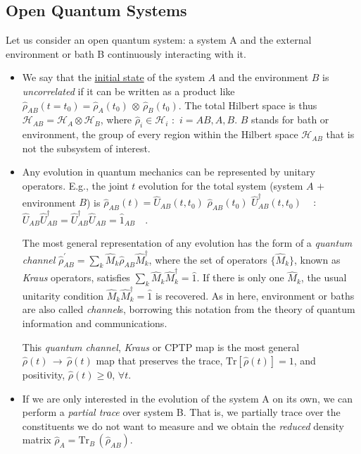 \documentclass[11pt]{article}
\numberwithin{equation}{section} %
\numberwithin{figure}{section} %
\begin{document}
\begin{appendices}
\newpage


\section{Open Quantum Systems} \label{open_quantum_system}

Let us consider an open quantum system: a system A and the external environment or bath B continuously interacting with it.  
\begin{itemize}
\item We say that the \uline{initial state} of the system $A$ and the environment $B$ is \emph{uncorrelated} if it can be written as a product like $\hat{\rho}_{AB}(t=t_0)=\hat{\rho}_A(t_0)\,\otimes\,\hat{\rho}_B(t_0)$. The  total  Hilbert  space  is  thus $\mathcal{H}_{AB}=\mathcal{H}_A\otimes\mathcal{H}_B$, where $\hat{\rho}_i\in\mathcal{H}_i$ $:$ $i=AB,A,B$. $B$ stands for bath or environment, the group of every region within the Hilbert space $\mathcal{H}_{AB}$ that is not the subsystem of interest.
\item Any evolution in quantum mechanics can be represented by unitary operators. E.g., the joint $t$ evolution for the  total  system (system $A$ $+$ environment $B$) is $\hat{\rho}_{AB}(t)=\hat{U}_{AB}(t,t_0)\,\,\hat{\rho}_{AB}(t_0)\,\,\hat{U}_{AB}^\dagger(t,t_0)$ $\,\,\,$ $:$ $\hat{U}_{AB}\hat{U}_{AB}^\dagger=\hat{U}_{AB}^\dagger\hat{U}_{AB}=\hat{1}_{AB}$ $\,\,$ \cite[p.~1076, l.~85-86]{Lloyd}.

The most general representation of any evolution has the form of a \emph{quantum channel} $\hat{\rho}_{AB}^\prime=\sum_k\hat{M}_{k}\hat{\rho}_{AB}\hat{M}_{k}^\dagger$, where the set of operators $\{\hat{M}_{k}\}$, known as \emph{Kraus} operators, satisfies $\sum_k\hat{M}_{k}\hat{M}_{k}^\dagger=\hat{1}$. If there is only one $\hat{M}_{k}$, the usual unitarity condition $\hat{M}_{k}\hat{M}_{k}^\dagger=\hat{1}$ is recovered. As in here, environment or baths are also called \emph{channel}s, borrowing this notation from the theory of quantum information and communications.

This \emph{quantum channel}, \emph{Kraus} or CPTP map is the most general $\hat{\rho}(t)\,\to\,\hat{\rho}(t)$ map that preserves the trace, $\textrm{Tr}[\hat{\rho}(t)]=1$, and positivity, $\hat{\rho}(t)\geq 0$, $\forall t$.

\item If we are only interested in the evolution of the system A on its own, we can perform a \emph{partial trace} over system B. That is, we partially trace over the constituents we do not want to measure and we obtain the \emph{reduced} density matrix $\hat{\rho}_A=\textrm{Tr}_B\,(\hat{\rho}_{AB})$. $\,\,\,$ \cite[p.~105, Eq.~(2.177-2.178)]{Nielsen}


\end{itemize}
\end{appendices}
\end{document}
